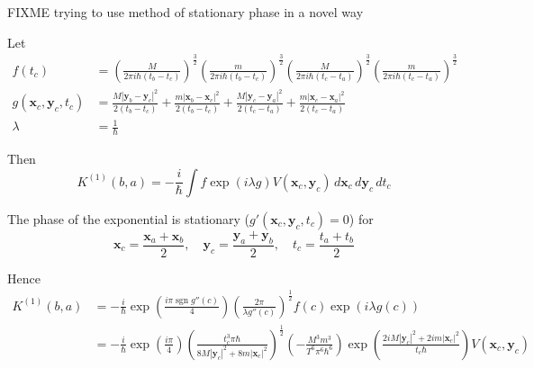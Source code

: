FIXME trying to use method of stationary phase in a novel way

\bigskip
Let
\begin{align*}
f(t_c)&=\left(\frac{M}{2\pi i\hbar(t_b-t_c)}\right)^\frac{3}{2}
\left(\frac{m}{2\pi i\hbar(t_b-t_c)}\right)^\frac{3}{2}
\left(\frac{M}{2\pi i\hbar(t_c-t_a)}\right)^\frac{3}{2}
\left(\frac{m}{2\pi i\hbar(t_c-t_a)}\right)^\frac{3}{2}
\\
g(\mathbf x_c,\mathbf y_c,t_c)
&=\frac{M|\mathbf y_b-\mathbf y_c|^2}{2(t_b-t_c)}
+\frac{m|\mathbf x_b-\mathbf x_c|^2}{2(t_b-t_c)}
+\frac{M|\mathbf y_c-\mathbf y_a|^2}{2(t_c-t_a)}
+\frac{m|\mathbf x_c-\mathbf x_a|^2}{2(t_c-t_a)}
\\
\lambda&=\frac{1}{\hbar}
\end{align*}

Then
\begin{equation*}
K^{(1)}(b,a)=-\frac{i}{\hbar}\int f\exp(i\lambda g)
V(\mathbf x_c,\mathbf y_c)
\,d\mathbf x_c\,d\mathbf y_c\,dt_c
\end{equation*}

The phase of the exponential is stationary ($g'(\mathbf x_c,\mathbf y_c,t_c)=0$) for
\begin{equation*}
\mathbf x_c=\frac{\mathbf x_a+\mathbf x_b}{2},\quad
\mathbf y_c=\frac{\mathbf y_a+\mathbf y_b}{2},\quad
t_c=\frac{t_a+t_b}{2}
\end{equation*}

Hence
\begin{align*}
K^{(1)}(b,a)&=-\frac{i}{\hbar}\exp\left(\frac{i\pi\operatorname{sgn}g''(c)}{4}\right)
\left(\frac{2\pi}{\lambda g''(c)}\right)^\frac{1}{2}
f(c)\exp(i\lambda g(c))
\\
&=-\frac{i}{\hbar}\exp\left(\frac{i\pi}{4}\right)
\left(\frac{t_c^3\pi\hbar}{8M|\mathbf y_c|^2+8m|\mathbf x_c|^2}\right)^\frac{1}{2}
\left(-\frac{M^3m^3}{T^6\pi^6\hbar^6}\right)
\exp\left(\frac{2iM|\mathbf y_c|^2+2im|\mathbf x_c|^2}{t_c\hbar}\right)
V(\mathbf x_c,\mathbf y_c)
\end{align*}


